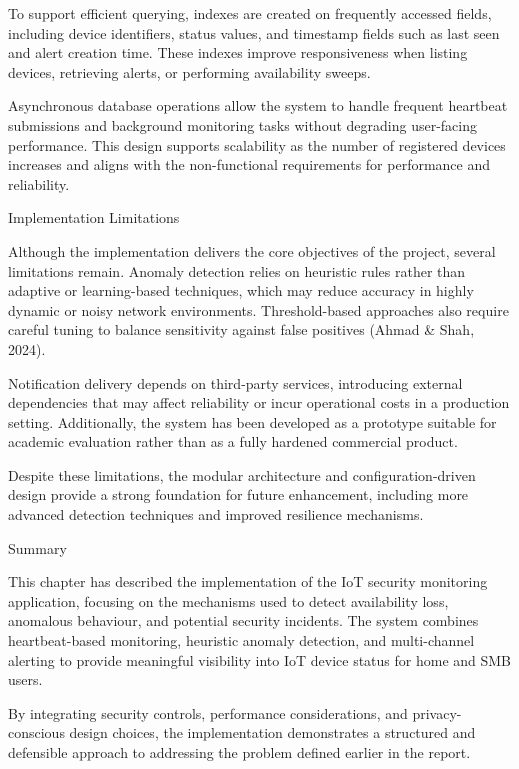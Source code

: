 To support efficient querying, indexes are created on frequently accessed fields, including device identifiers, status values, and timestamp fields such as last seen and alert creation time. These indexes improve responsiveness when listing devices, retrieving alerts, or performing availability sweeps.

Asynchronous database operations allow the system to handle frequent heartbeat submissions and background monitoring tasks without degrading user-facing performance. This design supports scalability as the number of registered devices increases and aligns with the non-functional requirements for performance and reliability.

Implementation Limitations

Although the implementation delivers the core objectives of the project, several limitations remain. Anomaly detection relies on heuristic rules rather than adaptive or learning-based techniques, which may reduce accuracy in highly dynamic or noisy network environments. Threshold-based approaches also require careful tuning to balance sensitivity against false positives (Ahmad \& Shah, 2024).

Notification delivery depends on third-party services, introducing external dependencies that may affect reliability or incur operational costs in a production setting. Additionally, the system has been developed as a prototype suitable for academic evaluation rather than as a fully hardened commercial product.

Despite these limitations, the modular architecture and configuration-driven design provide a strong foundation for future enhancement, including more advanced detection techniques and improved resilience mechanisms.

Summary

This chapter has described the implementation of the IoT security monitoring application, focusing on the mechanisms used to detect availability loss, anomalous behaviour, and potential security incidents. The system combines heartbeat-based monitoring, heuristic anomaly detection, and multi-channel alerting to provide meaningful visibility into IoT device status for home and SMB users.

By integrating security controls, performance considerations, and privacy-conscious design choices, the implementation demonstrates a structured and defensible approach to addressing the problem defined earlier in the report. 

